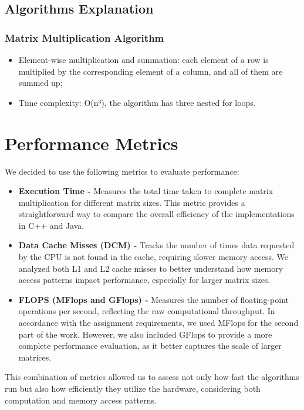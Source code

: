 \documentclass{article}
\begin{document}
\subsection{Algorithms Explanation}

\subsubsection{Matrix Multiplication Algorithm}

\begin{itemize}
    \item Element-wise multiplication and summation: each element of a row is multiplied by the corresponding element of a column, and all of them are summed up;
    \item Time complexity: O(n³), the algorithm has three nested for loops.
\end{itemize}

\section{Performance Metrics}

We decided to use the following metrics to evaluate performance:

\begin{itemize}
    \item \textbf{Execution Time - } Measures the total time taken to complete matrix multiplication for different matrix sizes. This metric provides a straightforward way to compare the overall efficiency of the implementations in C++ and Java.
    
    \item \textbf{Data Cache Misses (DCM) - } Tracks the number of times data requested by the CPU is not found in the cache, requiring slower memory access. We analyzed both L1 and L2 cache misses to better understand how memory access patterns impact performance, especially for larger matrix sizes.
    
    \item \textbf{FLOPS (MFlops and GFlops) - } Measures the number of floating-point operations per second, reflecting the raw computational throughput. In accordance with the assignment requirements, we used MFlops for the second part of the work. However, we also included GFlops to provide a more complete performance evaluation, as it better captures the scale of larger matrices.
\end{itemize}

This combination of metrics allowed us to assess not only how fast the algorithms run but also how efficiently they utilize the hardware, considering both computation and memory access patterns.
\end{document}
